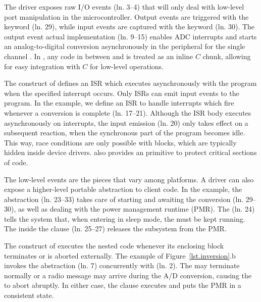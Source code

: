The driver exposes raw I/O events (ln. 3--4) that will only deal with low-level
port manipulation in the microcontroller.
Output events are triggered with the  keyword (ln. 29), while input
events are captured with the  keyword (ln. 30).
%
The output event  actual implementation (ln. 9--15) enables
ADC interrupts and starts an analog-to-digital conversion asynchronously in the
peripheral for the single channel .
In \CEU, any code in between \code{\{} and \code{\}} is treated as an inline
$C$ chunk, allowing for easy integration with $C$ for low-level operations.

The  construct of \CEU defines an ISR which executes
asynchronously with the program when the specified interrupt occurs.
Only ISRs can emit input events to the program.
In the example, we define an ISR to handle  interrupts which fire
whenever a conversion is complete (ln. 17--21).
%
Although the ISR body executes asynchronously on interrupts, the input emission
(ln. 20) only takes effect on a subsequent reaction, when the synchronous part
of the program becomes idle.
%
This way, race conditions are only possible with  blocks, which
are typically hidden inside device drivers.
\CEU also provides an  primitive to protect critical sections of
code.

The low-level events are the pieces that vary among platforms.
A driver can also expose a higher-level portable abstraction to client code.
%
In the example, the  abstraction (ln. 23--33) takes care of
starting and awaiting the conversion (ln. 29--30), as well as dealing with the
power management runtime (PMR).
%
The  (ln. 24) tells the system that, when entering in
sleep mode, the  must be kept running.
%
The  inside the  clause (ln. 25--27)
releases the  subsystem from the PMR.

The  construct of \CEU executes the nested code whenever its
enclosing block terminates or is aborted externally.
%
The example of Figure~\ref{lst.inversion}.b invokes the 
abstraction (ln. 7) concurrently with  (ln. 2).
%
The  may terminate normally or a radio message may arrive
during the A/D conversion, causing the  to abort abruptly.
In either case, the  clause executes and puts the PMR in a
consistent state.

